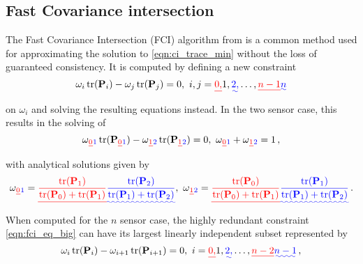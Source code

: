 \documentclass[letterpaper, 10 pt, conference]{ieeeconf}  %
\providecommand{\DIFadd}[1]{{\protect\color{blue}\uwave{#1}}} %
\providecommand{\DIFdel}[1]{{\protect\color{red}\sout{#1}}}                      %
\providecommand{\DIFaddbegin}{} %
\providecommand{\DIFaddend}{} %
\providecommand{\DIFdelbegin}{} %
\providecommand{\DIFdelend}{} %
\begin{document}
\subsection{Fast Covariance intersection}
The Fast Covariance Intersection (FCI) algorithm from \cite{niehsenInformationFusionBased2002} is a common method used for approximating the solution to \eqref{eqn:ci_trace_min} without the loss of guaranteed consistency. It is computed by defining a new constraint
\begin{equation}
   \omega_i \tr(\mP_i) - \omega_j \tr(\mP_j) = 0,\ i,j=\DIFdelbegin \DIFdel{0,}\DIFdelend 1,\DIFaddbegin \DIFadd{2,}\DIFaddend \dots,\DIFdelbegin \DIFdel{n-1 }\DIFdelend \DIFaddbegin \DIFadd{n }\DIFaddend \label{eqn:fci_eq_big}
\end{equation}
on $\omega_i$ and solving the resulting equations instead. In the two sensor case, this results in the solving of
\begin{equation}
   \omega\DIFdelbegin \DIFdel{_0 }\DIFdelend \DIFaddbegin \DIFadd{_1 }\DIFaddend \tr(\mP\DIFdelbegin \DIFdel{_0}\DIFdelend \DIFaddbegin \DIFadd{_1}\DIFaddend ) - \omega\DIFdelbegin \DIFdel{_1 }\DIFdelend \DIFaddbegin \DIFadd{_2 }\DIFaddend \tr(\mP\DIFdelbegin \DIFdel{_1}\DIFdelend \DIFaddbegin \DIFadd{_2}\DIFaddend ) = 0,\ \omega\DIFdelbegin \DIFdel{_0 }\DIFdelend \DIFaddbegin \DIFadd{_1 }\DIFaddend + \omega\DIFdelbegin \DIFdel{_1 }\DIFdelend \DIFaddbegin \DIFadd{_2 }\DIFaddend = 1\,, \label{eqn:fci_2sen_omega_sum_eq}
\end{equation}
with analytical solutions given by
\begin{equation}
   \omega\DIFdelbegin \DIFdel{_0 }\DIFdelend \DIFaddbegin \DIFadd{_1 }\DIFaddend = \DIFdelbegin \DIFdel{\frac{\tr(\mP_1)}{\tr(\mP_0)+\tr(\mP_1)}}\DIFdelend \DIFaddbegin \DIFadd{\frac{\tr(\mP_2)}{\tr(\mP_1)+\tr(\mP_2)}}\DIFaddend ,\ \omega\DIFdelbegin \DIFdel{_1 }\DIFdelend \DIFaddbegin \DIFadd{_2 }\DIFaddend = \DIFdelbegin \DIFdel{\frac{\tr(\mP_0)}{\tr(\mP_0)+\tr(\mP_1)}}\DIFdelend \DIFaddbegin \DIFadd{\frac{\tr(\mP_1)}{\tr(\mP_1)+\tr(\mP_2)}}\DIFaddend \,. \label{eqn:fci_2sen_sol}
\end{equation}
When computed for the $n$ sensor case, the highly redundant constraint \eqref{eqn:fci_eq_big} can have its largest linearly independent subset represented by
\begin{equation}
   \omega_i \tr(\mP_i) - \omega_{i+1} \tr(\mP_{i+1}) = 0,\ i=\DIFdelbegin \DIFdel{0,}\DIFdelend 1,\DIFaddbegin \DIFadd{2,}\DIFaddend \dots,\DIFdelbegin \DIFdel{n-2}\DIFdelend \DIFaddbegin \DIFadd{n-1}\DIFaddend \,, \label{eqn:fci_eq}
\end{equation}
\end{document}
